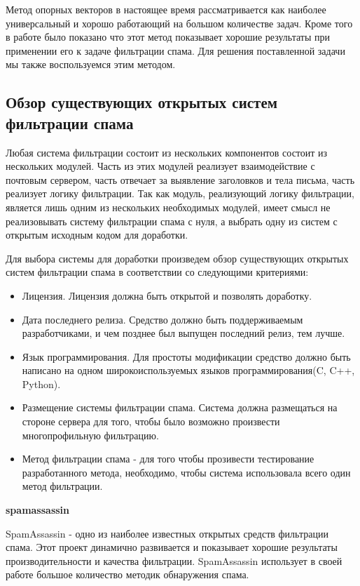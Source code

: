 Метод опорных векторов в настоящее время рассматривается как наиболее универсальный и хорошо работающий на большом количестве задач. Кроме того в работе\cite{ROZ} было показано что этот метод показывает хорошие результаты при применении его к задаче фильтрации спама. Для решения поставленной задачи мы также воспользуемся этим методом.

\subsection{Обзор существующих открытых систем фильтрации спама}
Любая система фильтрации состоит из нескольких компонентов состоит из нескольких модулей. Часть из этих модулей реализует взаимодействие с почтовым сервером, часть отвечает за выявление заголовков и тела письма, часть реализует логику фильтрации. Так как модуль, реализующий логику фильтрации, является лишь одним из нескольких необходимых модулей, имеет смысл не реализовывать систему фильтрации спама с нуля, а выбрать одну из систем с открытым исходным кодом для доработки.

Для выбора системы для доработки произведем обзор существующих открытых систем фильтрации спама в соответствии со следующими критериями:
\begin{itemize}
\item Лицензия. Лицензия должна быть открытой и позволять доработку.
\item Дата последнего релиза. Средство должно быть поддерживаемым разработчиками, и чем позднее был выпущен последний релиз, тем лучше.
\item Язык программирования. Для простоты модификации средство должно быть написано на одном широкоиспользуемых языков программирования(C, C++, Python).
\item Размещение системы фильтрации спама. Система должна размещаться на стороне сервера для того, чтобы было возможно произвести многопрофильную фильтрацию. 
\item Метод фильтрации спама - для того чтобы прозивести тестирование разработанного метода, необходимо, чтобы система использовала всего один метод фильтрации.
\end{itemize}

\textbf{spamassassin}

SpamAssassin - одно из наиболее известных открытых средств фильтрации спама. Этот проект динамично развивается и показывает хорошие результаты производительности и качества фильтрации. SpamAssassin использует в своей работе большое количество методик обнаружения спама.


